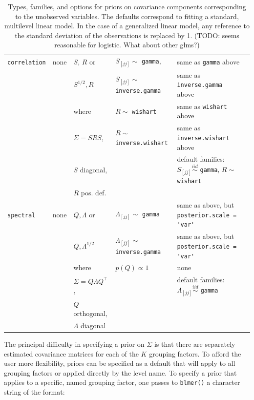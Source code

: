 \documentclass[10pt]{article}
\newcommand{\code}[1]{\texttt{#1}}
\begin{document}
\begin{table}
\begin{center}
{\begin{tabular}{llllll}
\code{correlation} & none & $S$, $R$ or            & $S_{[jj]} \sim $ \code{gamma}, & same as \code{gamma} above \\
                             &          & $S^{1/2}, R$            & $S_{[jj]} \sim $\code{inverse.gamma} & same as \code{inverse.gamma} above \\
                             &          & where  & $R \sim $ \code{wishart} & same as \code{wishart} above \\
                             &          & $\Sigma = SRS$,       &  $R \sim $ \code{inverse.wishart} & same as \code{inverse.wishart} above \\ 
                             &          & $S$ diagonal, & & default
                             families: $S_{[jj]} \overset{iid}{\sim} $
                             \code{gamma}, $R \sim $ \code{wishart}   \\ 
                             &          & $R$ pos. def.\\
\code{spectral}     & none & $Q, \Lambda$ or   & $\Lambda_{[jj]} \sim $ \code{gamma} & same as above, but \code{posterior.scale  = }\verb/'var'/ \\
                             &          & $Q, \Lambda^{1/2}$ & $\Lambda_{[jj]} \sim $ \code{inverse.gamma} & same as above, but \code{posterior.scale = }\verb/'var'/ \\
                             &          & where & $p(Q) \propto 1$ & none\\
                            &           & $\Sigma = Q\Lambda Q^\top$,
                            & & default
                             families: $\Lambda_{[jj]} \overset{iid}{\sim} $
                             \code{gamma} \\
                            &           & $Q$ orthogonal, \\
                            &           & $\Lambda$ diagonal
\end{tabular}
}
\end{center}
\caption{Types, families, and options for priors on covariance
  components corresponding to the unobserved variables. The defaults
  correspond to fitting a standard, multilevel linear model. In the
  case of a generalized linear model, any reference to the standard
  deviation of the observations is replaced by 1. (TODO: seems
  reasonable for logistic. What about other glms?)}
\label{tab:covariance_prior_options}
\end{table}

The principal difficulty in specifying a prior on $\Sigma$ is that there
are separately estimated covariance matrices for each of the $K$
grouping factors. To afford the user more flexibility, priors can be specified as a default
that will apply to all grouping factors or applied directly by the
level name. To specify a prior that applies to a specific, named
grouping factor, one passes to \code{blmer()} a character string of
the format:
\end{document}
